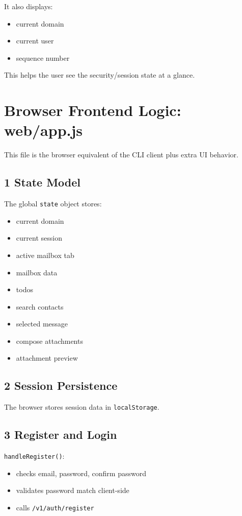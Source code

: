 \documentclass[11pt,a4paper]{article}
\begin{document}
It also displays:

\begin{itemize}
\item current domain
\item current user
\item sequence number
\end{itemize}

This helps the user see the security/session state at a glance.


\section{Browser Frontend Logic: web/app.js}

This file is the browser equivalent of the CLI client plus extra UI behavior.

\subsection{1 State Model}

The global \nolinkurl{state} object stores:

\begin{itemize}
\item current domain
\item current session
\item active mailbox tab
\item mailbox data
\item todos
\item search contacts
\item selected message
\item compose attachments
\item attachment preview
\end{itemize}

\subsection{2 Session Persistence}

The browser stores session data in \nolinkurl{localStorage}.

\subsection{3 Register and Login}

\nolinkurl{handleRegister()}:

\begin{itemize}
\item checks email, password, confirm password
\item validates password match client-side
\item calls \nolinkurl{/v1/auth/register}
\end{itemize}
\end{document}
